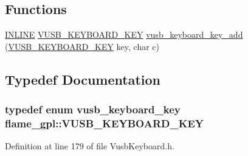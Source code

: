 \subsection*{Functions}
\begin{DoxyCompactItemize}
\item 
\hyperlink{io_8h_a2eb6f9e0395b47b8d5e3eeae4fe0c116}{I\-N\-L\-I\-N\-E} \hyperlink{namespaceflame__gpl_a40752e4f9e83da1573a3d418e0bd5653}{V\-U\-S\-B\-\_\-\-K\-E\-Y\-B\-O\-A\-R\-D\-\_\-\-K\-E\-Y} \hyperlink{namespaceflame__gpl_aae69f913c4df49da9d35286578c3ac4c}{vusb\-\_\-keyboard\-\_\-key\-\_\-add} (\hyperlink{namespaceflame__gpl_a40752e4f9e83da1573a3d418e0bd5653}{V\-U\-S\-B\-\_\-\-K\-E\-Y\-B\-O\-A\-R\-D\-\_\-\-K\-E\-Y} key, char c)
\end{DoxyCompactItemize}


\subsection{Typedef Documentation}
\hypertarget{namespaceflame__gpl_a40752e4f9e83da1573a3d418e0bd5653}{
\subsubsection[{V\-U\-S\-B\-\_\-\-K\-E\-Y\-B\-O\-A\-R\-D\-\_\-\-K\-E\-Y}]{\setlength{\rightskip}{0pt plus 5cm}typedef enum {\bf vusb\-\_\-keyboard\-\_\-key} {\bf flame\-\_\-gpl\-::\-V\-U\-S\-B\-\_\-\-K\-E\-Y\-B\-O\-A\-R\-D\-\_\-\-K\-E\-Y}}}\label{namespaceflame__gpl_a40752e4f9e83da1573a3d418e0bd5653}


Definition at line 179 of file Vusb\-Keyboard.\-h.



